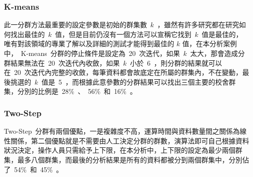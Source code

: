 
\subsubsection{K-means}

此一分群方法最重要的設定參數是初始的群集數~$k$~，雖然有許多研究都在研究如何找出最佳的~$k$~值，但是目前仍沒有一個方法可以宣稱它找到~$k$~值是最佳的，唯有對該領域的專業了解以及詳細的測試才能得到最佳的 $k$ 值，在本分析案例中，~K-means~分群的停止條件是設定為~20~次迭代，如果~$k$~太大，那會造成分群結果無法在~20~次迭代內收斂，如果~$k$~小於~6~，則分群的結果就可以在~20~次迭代內完整的收斂，每筆資料都會故底定在所屬的群集內，不在變動，最後挑選的~$k$~值是~5~，而根據此意參數的分群結果可以找出三個主要的校舍群集，分別的比例是~28\%~、~56\%~和~16\%~。


\subsubsection{Two-Step}

Two-Step~分群有兩個優點，一是複雜度不高，運算時間與資料數量間之關係為線性關係，第二個優點就是不需要由人工決定分群的群數，演算法即可自己根據資料狀況決定，操作人員只需給予上下限，在本分析中，上下限的設定為最少兩個群集，最多八個群集，而最後的分析結果是所有的資料都被分到兩個群集中，分別佔了~54\%~和~45\%~。

